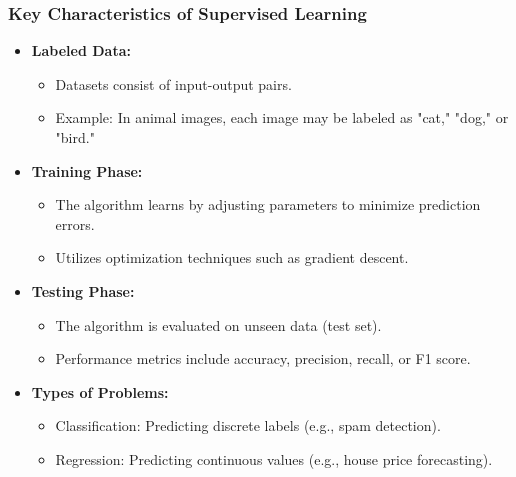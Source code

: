 \documentclass[aspectratio=169]{beamer}
\begin{document}
\begin{frame}[fragile]
    \frametitle{Key Characteristics of Supervised Learning}
    \begin{itemize}
        \item \textbf{Labeled Data:}
        \begin{itemize}
            \item Datasets consist of input-output pairs.
            \item Example: In animal images, each image may be labeled as "cat," "dog," or "bird."
        \end{itemize}
        
        \item \textbf{Training Phase:}
        \begin{itemize}
            \item The algorithm learns by adjusting parameters to minimize prediction errors.
            \item Utilizes optimization techniques such as gradient descent.
        \end{itemize}

        \item \textbf{Testing Phase:}
        \begin{itemize}
            \item The algorithm is evaluated on unseen data (test set).
            \item Performance metrics include accuracy, precision, recall, or F1 score.
        \end{itemize}

        \item \textbf{Types of Problems:}
        \begin{itemize}
            \item Classification: Predicting discrete labels (e.g., spam detection).
            \item Regression: Predicting continuous values (e.g., house price forecasting).
        \end{itemize}
    \end{itemize}
\end{frame}
\end{document}

